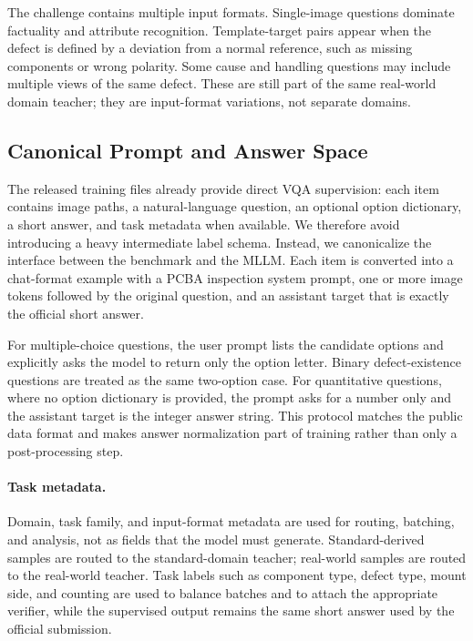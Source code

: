 \documentclass[sigconf, screen, review, anonymous]{acmart}
\begin{document}
The challenge contains multiple input formats. Single-image questions dominate factuality and attribute recognition. Template-target pairs appear when the defect is defined by a deviation from a normal reference, such as missing components or wrong polarity. Some cause and handling questions may include multiple views of the same defect. These are still part of the same real-world domain teacher; they are input-format variations, not separate domains.

\subsection{Canonical Prompt and Answer Space}
\label{subsec:answer_space}

The released training files already provide direct VQA supervision: each item contains image paths, a natural-language question, an optional option dictionary, a short answer, and task metadata when available. We therefore avoid introducing a heavy intermediate label schema. Instead, we canonicalize the interface between the benchmark and the MLLM. Each item is converted into a chat-format example with a PCBA inspection system prompt, one or more image tokens followed by the original question, and an assistant target that is exactly the official short answer.

For multiple-choice questions, the user prompt lists the candidate options and explicitly asks the model to return only the option letter. Binary defect-existence questions are treated as the same two-option case. For quantitative questions, where no option dictionary is provided, the prompt asks for a number only and the assistant target is the integer answer string. This protocol matches the public data format and makes answer normalization part of training rather than only a post-processing step.

\paragraph{Task metadata.}
Domain, task family, and input-format metadata are used for routing, batching, and analysis, not as fields that the model must generate. Standard-derived samples are routed to the standard-domain teacher; real-world samples are routed to the real-world teacher. Task labels such as component type, defect type, mount side, and counting are used to balance batches and to attach the appropriate verifier, while the supervised output remains the same short answer used by the official submission.
\end{document}
